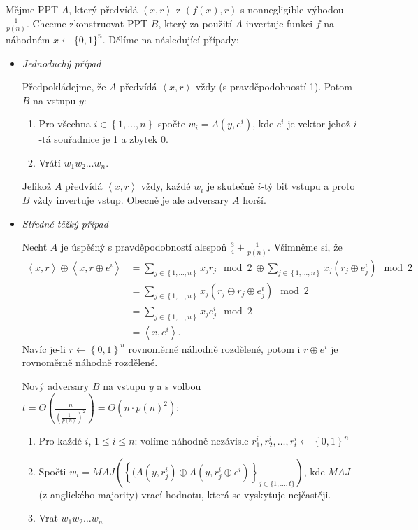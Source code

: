 \documentclass[a4paper,12pt,titlepage]{article}
\def\dukaz{\noindent {\bf Důkaz: }}
\begin{document}
\dukaz Mějme PPT $A$, který předvídá $\left<x,r\right>$ z $(f(x),r)$ s nonnegligible výhodou $\frac{1}{p(n)}$.
Chceme zkonstruovat PPT $B$, který za použití $A$ invertuje funkci $f$ na náhodném $x \leftarrow \{0,1\}^n$.
Dělíme na následující případy:

\begin{itemize}
	\item \emph{Jednoduchý případ}

		Předpokládejme, že $A$ předvídá $\left<x,r\right>$ vždy (s pravděpodobností 1).
		Potom $B$ na vstupu $y$:
		\begin{enumerate}
			\item  Pro všechna $i \in \left\{ 1, \ldots ,n \right\}$ spočte $w_i = A\left( y,e^i \right)$, kde $e^i$ je vektor jehož $i$-tá souřadnice je 1 a zbytek 0.
			\item  Vrátí $w_1w_2 \ldots w_n$.
		\end{enumerate}
		Jelikož $A$ předvídá $\left<x,r\right>$ vždy, každé $w_i$ je skutečně $i$-tý bit vstupu a proto $B$ vždy invertuje vstup.
		Obecně je ale adversary $A$ horší.

	\item  \emph{Středně těžký případ}
		
		Nechť $A$ je úspěšný s pravděpodobností alespoň $\frac{3}{4} + \frac{1}{p(n)}$.
		Všimněme si, že 
		\begin{align*}
		\left<x,r\right>\oplus\left<x,r\oplus e^i\right> &= \sum_{j \in \left\{ 1,\ldots ,n \right\}} x_j r_j\mod 2\ \oplus \sum_{j \in \left\{ 1, \ldots ,n \right\}} x_j(r_j\oplus e_j^i) \mod 2 \\
		&= \sum_{j \in \left\{ 1, \ldots , n \right\}} x_j (r_j\oplus r_j \oplus e_j^i) \mod 2 \\
		&= \sum_{j \in \left\{ 1, \ldots , n \right\}} x_je^i_j \mod 2 \\
		&= \left<x,e^i\right>.
		\end{align*}
		Navíc je-li $r\leftarrow\left\{ 0,1 \right\}^n$ rovnoměrně náhodně rozdělené, potom i $r \oplus e^i$ je rovnoměrně náhodně rozdělené.

		Nový adversary $B$ na vstupu $y$ a s volbou $t = \Theta (\frac{n}{(\frac{1}{p(n)})^2})=\Theta (n\cdot p(n)^2)$:
		\begin{enumerate}
			\item Pro každé $i$, $1\leq i \leq n$: volíme náhodně nezávisle $r^i_1,r^i_2, \ldots , r^i_t \leftarrow \left\{ 0,1 \right\}^n$
			\item Spočti $w_i = MAJ\left(\left\{(A(y,r^i_j) \oplus A(y,r^i_j\oplus e^i)\right\}_{j \in \{1, \ldots , t\}}\right)$, kde $MAJ$ (z anglického majority) vrací hodnotu, která se vyskytuje nejčastěji.
			\item  Vrať $w_1w_2 \ldots w_n$
		\end{enumerate}


\end{itemize}
\end{document}
